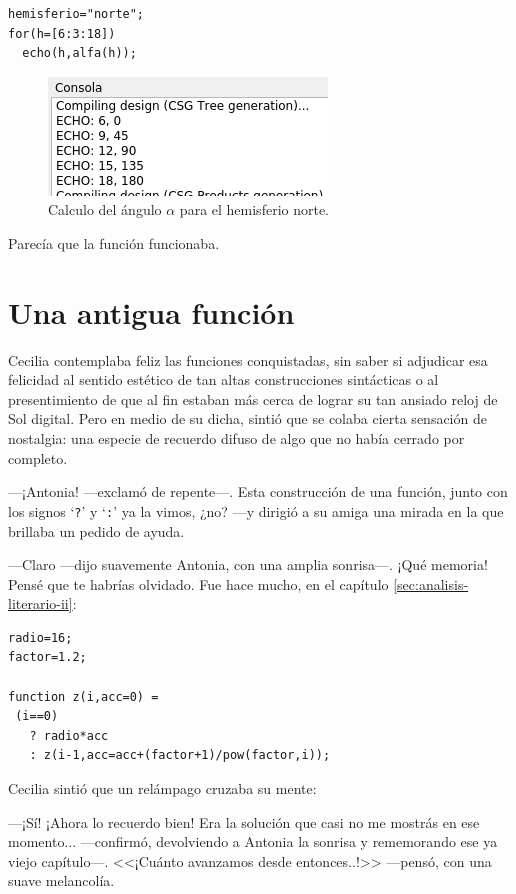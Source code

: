 \begin{lstlisting}
hemisferio="norte";
for(h=[6:3:18])
  echo(h,alfa(h));
\end{lstlisting}

\begin{figure}[ht]
  \centering
  \includegraphics[width=.55\textwidth]{imagenes/consola-echo-alfa-norte}
  \caption[$alpha$ para el hemisferio norte.]{Calculo del ángulo
    $\alpha$ para el hemisferio norte.}
  \label{fig:consola-echo-alfa-norte}
\end{figure}

Parecía que la función funcionaba.

\section{Una antigua función}

Cecilia contemplaba feliz las funciones conquistadas, sin saber si
adjudicar esa felicidad al sentido estético de tan altas
construcciones sintácticas o al presentimiento de que al fin estaban
más cerca de lograr su tan ansiado reloj de Sol digital. Pero en medio
de su dicha, sintió que se colaba cierta sensación de nostalgia: una
especie de recuerdo difuso de algo que no había cerrado por
completo.

---¡Antonia! ---exclamó de repente---. Esta construcción de una
función, junto con los signos `\lstinline!?!' y `\lstinline!:!' ya la
vimos, ¿no? ---y dirigió a su amiga una mirada en la que brillaba un
pedido de ayuda.

---Claro ---dijo suavemente Antonia, con una amplia son\-ri\-sa---. ¡Qué
memoria! Pensé que te habrías olvidado. Fue hace mucho, en el capítulo
\ref{sec:analisis-literario-ii}:

\begin{lstlisting}
radio=16;
factor=1.2;

function z(i,acc=0) =
 (i==0) 
   ? radio*acc 
   : z(i-1,acc=acc+(factor+1)/pow(factor,i));
\end{lstlisting}

Cecilia sintió que un relámpago cruzaba su mente:

---¡Sí!  ¡Ahora lo recuerdo bien! Era la solución que casi no me
mostrás en ese momento... ---confirmó, devolviendo a Antonia la
sonrisa y rememorando ese ya viejo capítulo---. <<¡Cuánto avanzamos
desde entonces..!>> ---pensó, con una suave melancolía.

